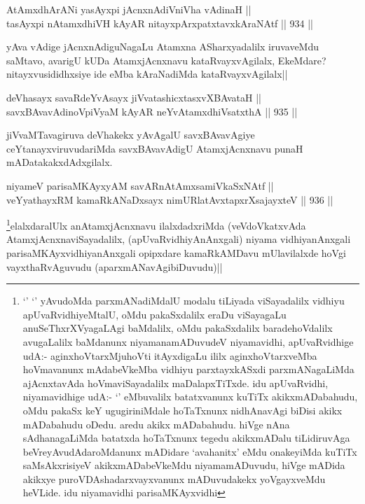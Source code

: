 
\begin{shl}
AtAmxdhArANi yasAyxpi jAcnxnAdiVniVha vAdinaH || \\
tasAyxpi nA\s \s tamxdhiVH kAyAR nitayxpArxpatxtavxkAraNAtf ||  934 ||  
\end{shl}

\begin{artha}
yAva vAdige jAcnxnAdiguNagaLu Atamxna ASharxyadalilx iruvaveMdu saMtavo, avarigU kUDa AtamxjAcnxnavu kataRvayxvAgilalx, EkeMdare? nitayxvusididhxsiye ide eMba kAraNadiMda kataRvayxvAgilalx||
\end{artha}


\begin{shl}
deVhasayx savaRdeYvAsayx jiVvatashicxtasxvXBAvataH ||  \\
savxBAvavAdinoV\s piVyaM kAyAR neYvA\s \s tamxdhiVsatxthA ||  935 ||  
\end{shl}

\begin{artha}
jiVvaMTavagiruva deVhakekx yAvAgalU savxBAvavAgiye ceYtanayxviruvudariMda savxBAvavAdigU AtamxjAcnxnavu punaH mADatakakxdAdxgilalx.
\end{artha}


\begin{shl}
niyameV parisaMKAyxyAM savARnAtAmxsamiVkaSxNAtf || \\
veYyathayxRM kamaRkANaDxsayx nimURlatAvxtapxrXsajayxteV ||  936 ||  
\end{shl}

\begin{artha}
\footnote{`\stext' `\stext' yAvudoMda parxmANadiMdalU modalu tiLiyada viSayadalilx vidhiyu apUvaRvidhiyeMtalU, oMdu pakaSxdalilx eraDu viSayagaLu anuSeThxrXVyagaLAgi baMdalilx, oMdu pakaSxdalilx baradehoVdalilx avugaLalilx baMdanunx niyamanamADuvudeV niyamavidhi, apUvaRvidhige udA:- aginxhoVtarxMjuhoVti itAyxdigaLu ililx aginxhoVtarxveMba hoVmavanunx mAdabeVkeMba vidhiyu parxtayxkASxdi parxmANagaLiMda ajAcnxtavAda hoVmaviSayadalilx maDalapxTiTxde. idu apUvaRvidhi, niyamavidhige udA:- `\stext' eMbuvalilx batatxvanunx kuTiTx akikxmADabahudu, oMdu pakaSx keY ugugiriniMdale hoTaTxnunx nidhAnavAgi biDisi akikx mADabahudu oDedu. aredu akikx mADabahudu. hiVge nAna sAdhanagaLiMda batatxda hoTaTxnunx tegedu akikxmADalu tiLidiruvAga beVreyAvudAdaroMdanunx mADidare `avahanitx' eMdu onakeyiMda kuTiTx saMsAkxrisiyeV akikxmADabeVkeMdu niyamamADuvudu, hiVge mADida akikxye puroVDAshadarxvayxvanunx mADuvudakekx yoVgayxveMdu heVLide. idu niyamavidhi parisaMKAyxvidhi}elalxdaralUlx anAtamxjAcnxnavu ilalxdadxriMda (veVdoVkatxvAda AtamxjAcnxnaviSayadalilx, (apUvaRvidhiyAnAnxgali) niyama vidhiyanAnxgali parisaMKAyxvidhiyanAnxgali opipxdare kamaRkAMDavu mUlavilalxde hoVgi vayxthaRvAguvudu (aparxmANavAgibiDuvudu)||
\end{artha}

